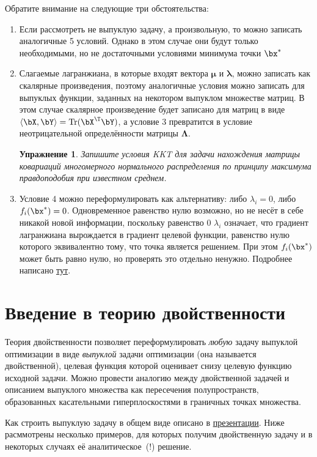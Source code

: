 \documentclass[12pt]{article}
\newcommand{\bmu}{\boldsymbol{\mu}}
\newcommand{\blambda}{\boldsymbol{\lambda}}
\newcommand{\bLambda}{\boldsymbol{\Lambda}}
\newtheorem{Ex}{Упражнение}
\begin{document}
Обратите внимание на следующие три обстоятельства:
\begin{enumerate}
\item Если рассмотреть не выпуклую задачу, а произвольную, то можно записать аналогичные 5 условий. 
Однако в этом случае они будут только необходимыми, но не достаточными условиями минимума точки $\bx^*$
\item Слагаемые лагранжиана, в которые входят вектора $\bmu$ и $\blambda$, можно записать как скалярные произведения, поэтому аналогичные условия можно записать для выпуклых функции, заданных на некотором выпуклом множестве матриц.
В этом случае скалярное произведение будет записано для матриц в виде $\langle \bX, \bY \rangle = \mathrm{Tr}(\bX^{\T}\bY)$, а условие 3 превратится в условие неотрицательной определённости матрицы $\bLambda$.
\begin{Ex}
Запишите условия KKT для задачи нахождения матрицы ковариаций многомерного нормального распределения по принципу максимума правдоподобия при известном среднем.
\end{Ex}
\item Условие 4 можно переформулировать как альтернативу: либо $\lambda_i = 0$, либо $f_i(\bx^*) = 0$. 
Одновременное равенство нулю возможно, но не несёт в себе никакой новой информации, поскольку равенство 0 $\lambda_i$ означает, что градиент лагранжиана вырождается в градиент целевой функции, равенство нулю которого эквивалентно тому, что точка является решением. При этом $f_i(\bx^*)$ может быть равно нулю, но проверять это отдельно ненужно. Подробнее написано \href{https://mathoverflow.net/questions/248314/zero-lambda-zero-constraint-in-the-complementary-slackness-condition-of-the-kuh}{тут}.

\end{enumerate}

\section{Введение в теорию двойственности}

Теория двойственности позволяет переформулировать \emph{любую} задачу выпуклой оптимизации в виде \emph{выпуклой} задачи оптимизации (она называется двойственной), целевая функция которой оценивает снизу целевую функцию исходной задачи. 
Можно провести аналогию между двойственной задачей и описанием выпуклого множества как пересечения полупространств, образованных касательными гиперплоскостями в граничных точках множества.

Как строить выпуклую задачу в общем виде описано в \href{https://github.com/amkatrutsa/cet_opt_met/blob/master/05-KKT/05-KKT.pdf}{презентации}. 
Ниже расммотрены несколько примеров, для которых получим двойственную задачу и в некоторых случаях её аналитическое~(!) решение.
\end{document}
